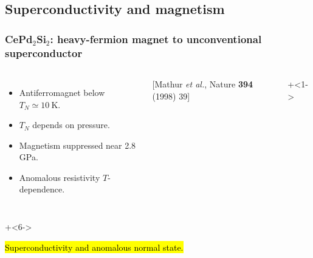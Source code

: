 \subsection{Superconductivity and magnetism}
\begin{frame}[label=CPS]
\frametitle{CePd$_2$Si$_2$: heavy-fermion magnet to unconventional superconductor}
\begin{columns}[t]
  \begin{itemize}
  \item<1-> Antiferro\-magnet below $T_N\simeq 10 ~\mathrm K$.

  \item<2-> $T_N$ depends on pressure.

  \item<4->  Magnetism suppressed near 2.8 GPa.

  \item<5-> Anomalous resistivity $T$-dependence.
  \end{itemize}

\vspace{1em}
\centerline{\scriptsize [Mathur {\em et al.}, Nature {\bf 394} (1998) 39]}
  \centerline{}
  \onslide+<1->
  \centerline{}
\end{columns}
\onslide+<6->
\begin{center}
\hl{Superconductivity and anomalous normal state.}
\end{center}
\end{frame}



